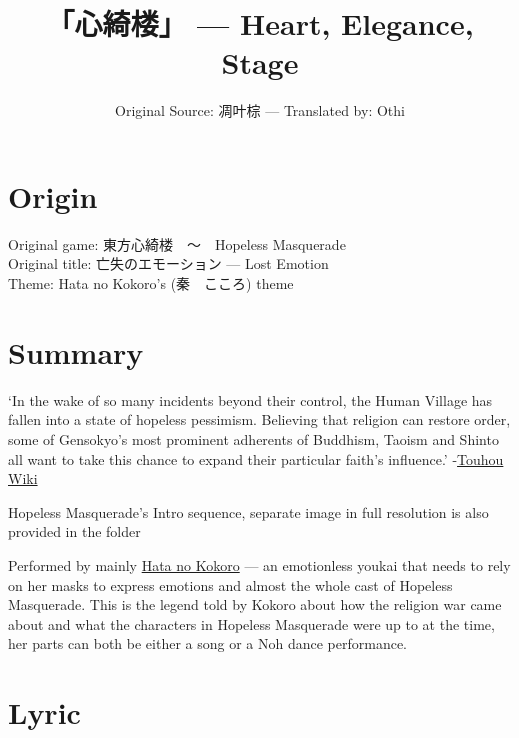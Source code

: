 \documentclass{article}
\title{「心綺楼」 --- Heart, Elegance, Stage}
\author{Original Source: 凋叶棕 --- Translated by: Othi}
\begin{document}
\maketitle

\tableofcontents
\section{Origin}
\noindent Original game: 東方心綺楼　～　Hopeless Masquerade \\
Original title: 亡失のエモーション --- Lost Emotion \\
Theme: Hata no Kokoro's (秦　こころ) theme

\section{Summary}
`In the wake of so many incidents beyond their control, the Human Village has fallen into a state of hopeless pessimism. Believing that religion can restore order, some of Gensokyo's most prominent adherents of Buddhism, Taoism and Shinto all want to take this chance to expand their particular faith's influence.' -\href{https://en.touhouwiki.net/wiki/Hopeless_Masquerade#Plot}{Touhou Wiki}
\begin{center}
Hopeless Masquerade's Intro sequence, separate image in full resolution is also provided in the folder
\end{center}

Performed by mainly \href{https://en.touhouwiki.net/wiki/Hata_no_Kokoro}{Hata no Kokoro} --- an emotionless youkai that needs to rely on her masks to express emotions and almost the whole cast of Hopeless Masquerade. This is the legend told by Kokoro about how the religion war came about and what the characters in Hopeless Masquerade were up to at the time, her parts can both be either a song or a Noh dance performance.

\section{Lyric}
\end{document}
